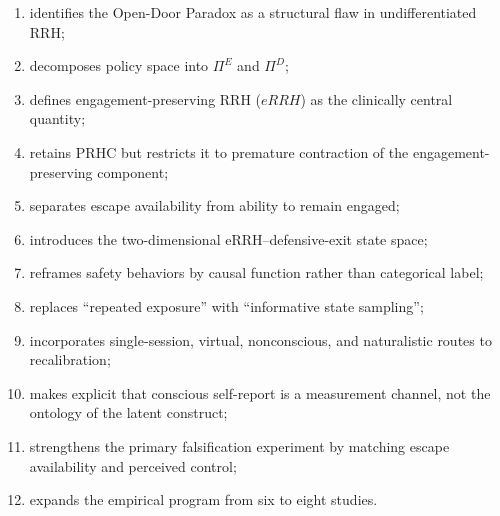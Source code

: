 \documentclass[11pt]{article}
\begin{document}
\begin{enumerate}[leftmargin=*]
\item identifies the Open-Door Paradox as a structural flaw in undifferentiated RRH;
\item decomposes policy space into $\Pi^E$ and $\Pi^D$;
\item defines engagement-preserving RRH ($eRRH$) as the clinically central quantity;
\item retains PRHC but restricts it to premature contraction of the engagement-preserving component;
\item separates escape availability from ability to remain engaged;
\item introduces the two-dimensional eRRH--defensive-exit state space;
\item reframes safety behaviors by causal function rather than categorical label;
\item replaces ``repeated exposure'' with ``informative state sampling'';
\item incorporates single-session, virtual, nonconscious, and naturalistic routes to recalibration;
\item makes explicit that conscious self-report is a measurement channel, not the ontology of the latent construct;
\item strengthens the primary falsification experiment by matching escape availability and perceived control;
\item expands the empirical program from six to eight studies.
\end{enumerate}
\end{document}
